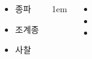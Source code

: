 \documentclass[	20pt, 
							a0paper, 
							landscape,
							margin=0mm, %
							innermargin=10mm,  		%
							blockverticalspace=4mm, %
							colspace=5mm, 
							subcolspace=0mm
							]{tikzposter}
\begin{document}
\begin{columns}
{\begin{LARGE}
\begin{itemize}
					\item 종파
					\item 조계종

					\item 사찰


					\end{itemize}
				\end{LARGE}
			} %


			{
					\setlength{\leftmargini}{3em}
					\setlength{\labelsep} {1em}
				\begin{LARGE}
					\begin{itemize}
					\item 
					\item 
					\item 
					\end{itemize}
				\end{LARGE}
			} %







	\end{columns}
\end{document}
